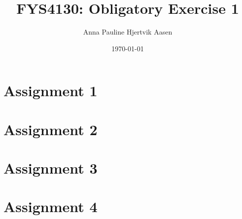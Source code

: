 \documentclass[onecolumn,english,notitlepage]{article}
\title{FYS4130: Obligatory Exercise 1}
\author{Anna Pauline Hjertvik Aasen}
\date{\today}
\begin{document}
\maketitle

\section*{Assignment 1}


\section*{Assignment 2}


\section*{Assignment 3}


\section*{Assignment 4}

\end{document}
